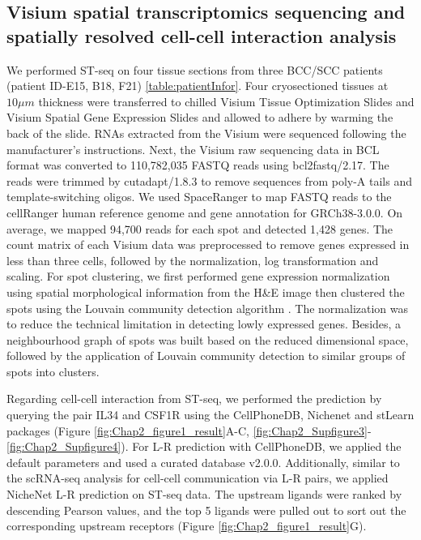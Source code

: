 \subsection{Visium spatial transcriptomics sequencing and spatially resolved cell-cell interaction analysis}
We performed ST-seq on four tissue sections from three BCC/SCC patients (patient ID-E15, B18, F21) \ref{table:patientInfor}. Four cryosectioned tissues at $10\mu m$ thickness were transferred to chilled Visium Tissue Optimization Slides and Visium Spatial Gene Expression Slides and allowed to adhere by warming the back of the slide. RNAs extracted from the Visium were sequenced following the manufacturer’s instructions. Next, the Visium raw sequencing data in BCL format was converted to 110,782,035 FASTQ reads using bcl2fastq/2.17. The reads were trimmed by cutadapt/1.8.3 to remove sequences from poly-A tails and template-switching oligos. We used SpaceRanger to map FASTQ reads to the cellRanger human reference genome and gene annotation for GRCh38-3.0.0. On average, we mapped 94,700 reads for each spot and detected 1,428 genes. The count matrix of each Visium data was preprocessed to remove genes expressed in less than three cells, followed by the normalization, log transformation and scaling. For spot clustering, we first performed gene expression normalization using spatial morphological information from the H\&E image then clustered the spots using the Louvain community detection algorithm \cite{pham2020stlearn}. The normalization was to reduce the technical limitation in detecting lowly expressed genes. Besides, a neighbourhood graph of spots was built based on the reduced dimensional space, followed by the application of Louvain community detection to similar groups of spots into clusters. 

Regarding cell-cell interaction from ST-seq, we performed the prediction by querying the pair IL34 and CSF1R using the CellPhoneDB, Nichenet and stLearn packages \cite{pham2020stlearn, efremova2020cellphonedb, browaeys2020nichenet} (Figure \ref{fig:Chap2_figure1_result}A-C, \ref{fig:Chap2_Supfigure3}-\ref{fig:Chap2_Supfigure4}). For L-R prediction with CellPhoneDB, we applied the default parameters \cite{browaeys2020nichenet, efremova2020cellphonedb} and used a curated database v2.0.0. Additionally, similar to the scRNA-seq analysis for cell-cell communication via L-R pairs, we applied NicheNet L-R prediction on ST-seq data. The upstream ligands were ranked by descending Pearson values, and the top 5 ligands were pulled out to sort out the corresponding upstream receptors (Figure \ref{fig:Chap2_figure1_result}G).  

